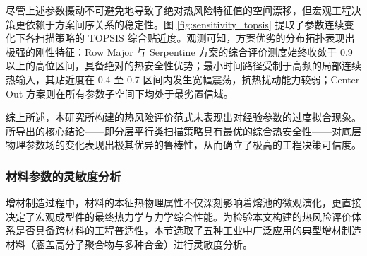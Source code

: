 \documentclass[a4paper, 12pt]{ctexart}
\begin{document}
尽管上述参数摄动不可避免地导致了绝对热风险特征值的空间漂移，但宏观工程决策更依赖于方案间序关系的稳定性。图 \ref{fig:sensitivity_topsis} 提取了参数连续变化下各扫描策略的 TOPSIS 综合贴近度。观测可知，方案优劣的分布拓扑表现出极强的刚性特征：Row Major 与 Serpentine 方案的综合评价测度始终收敛于 0.9 以上的高位区间，具备绝对的热安全性优势；最小时间路径受制于高频的局部连续热输入，其贴近度在 0.4 至 0.7 区间内发生宽幅震荡，抗热扰动能力较弱；Center Out 方案则在所有参数子空间下均处于最劣置信域。

综上所述，本研究所构建的热风险评价范式未表现出对经验参数的过度拟合现象。所导出的核心结论——即分层平行类扫描策略具有最优的综合热安全性——对底层物理参数场的变化表现出极其优异的鲁棒性，从而确立了极高的工程决策可信度。

\subsubsection{材料参数的灵敏度分析}

增材制造过程中，材料的本征热物理属性不仅深刻影响着熔池的微观演化，更直接决定了宏观成型件的最终热力学与力学综合性能\cite{ref1}。为检验本文构建的热风险评价体系是否具备跨材料的工程普适性，本节选取了五种工业中广泛应用的典型增材制造材料（涵盖高分子聚合物与多种合金）进行灵敏度分析。

\begin{table}[htbp]
    \centering
    \caption{五种典型增材制造材料的热力学本征参数与模型特征映射}
    \label{tab:material_properties}
\end{table}
\end{document}
